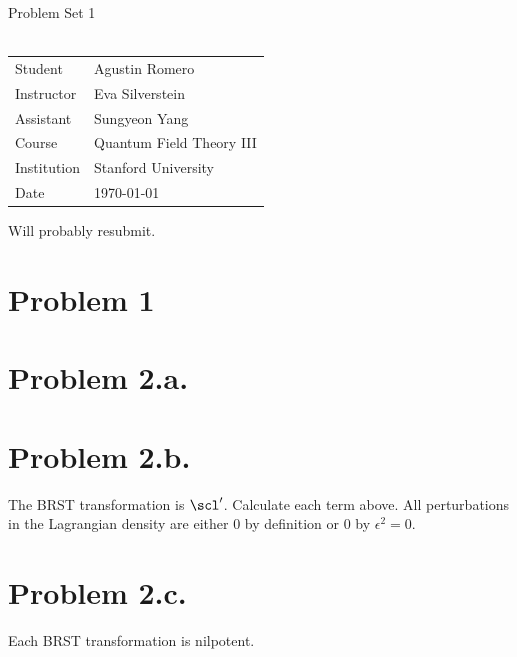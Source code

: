 \documentclass{article}
\begin{document}
\begin{center}
{\Large{Problem Set 1}}\\~\\
\begin{tabular}{l l}
Student&Agustin Romero\\
Instructor&Eva Silverstein\\
Assistant&Sungyeon Yang\\
Course&Quantum Field Theory III\\    
Institution&Stanford University\\
Date&\today\\
\end{tabular}
\end{center}
Will probably resubmit.
\section*{Problem 1}
\section*{Problem 2.a.}
\section*{Problem 2.b.}
The BRST transformation is $\scl'$. Calculate each term above.
All perturbations in the Lagrangian density are either 0 by definition or 0 by $\epsilon^2=0$.
\section*{Problem 2.c.}
Each BRST transformation is nilpotent.
\end{document}
